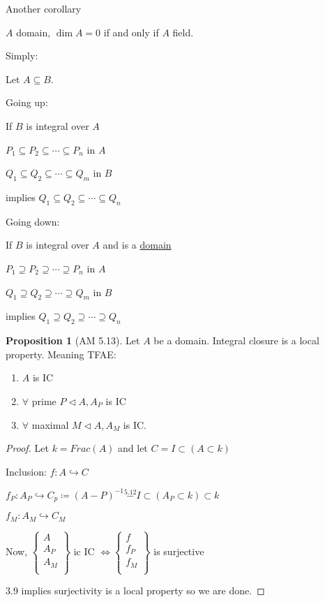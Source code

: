 \documentclass{article}
\theoremstyle{definition}
\newtheorem{proposition}{Proposition}
\begin{document}
Another corollary

\(A\) domain, \(\dim A = 0\) if and only if \(A\) field.

Simply:

Let \(A \subseteq B\).

Going up:

If \(B\) is integral over \(A\) 

\(P_1 \subseteq P_2 \subseteq \cdots \subseteq P_n\) in \(A\) 

\(Q_1 \subseteq Q_2 \subseteq \cdots \subseteq Q_m\) in \(B\) 

implies \(Q_1 \subseteq Q_2 \subseteq \cdots \subseteq Q_n\) 

Going down:

If \(B\) is integral over \(A\) and is a \underline{domain} 

\(P_1 \supseteq P_2 \supseteq \cdots \supseteq P_n\) in \(A\) 

\(Q_1 \supseteq Q_2 \supseteq \cdots \supseteq Q_m\) in \(B\)

implies \(Q_1 \supseteq Q_2 \supseteq \cdots \supseteq Q_n\) 

\begin{proposition}
    [AM 5.13]

    Let \(A\) be a domain. Integral closure is a local property. Meaning TFAE:

    \begin{enumerate}
        [label=\roman*]

        \item \(A\) is IC
        \item \(\forall\) prime \(P \triangleleft A, A_P\) is IC
        \item \(\forall\) maximal \(M \triangleleft A, A_M\) is IC.    
    \end{enumerate}
\end{proposition}

\begin{proof}
    Let \(k = Frac(A)\) and let \(C = I \subset (A \subset k)\)
    
    Inclusion: \(f:A\hookrightarrow C\)
    
    \(f_P : A_P \hookrightarrow C_p \coloneqq (A-P)^{-1}  \overset{5.12}{-} I \subset (A_P \subset k) \subset k\) 

    \(f_M : A_M \hookrightarrow C_M\) 

    Now, \(\begin{Bmatrix}
         A \\
         A_P \\
         A_M \\
    \end{Bmatrix}\) ic IC \(\iff \begin{Bmatrix}
         f \\
         f_P \\
         f_M \\
    \end{Bmatrix}\) is surjective  

    3.9 implies surjectivity is a local property so we are done.
\end{proof}
\end{document}

